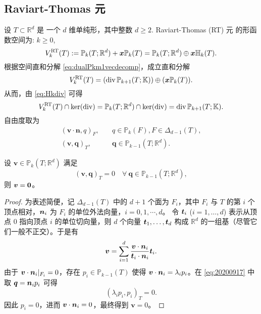 

\subsection{Raviart-Thomas 元}

设 $T\subset \mathbb R^d$ 是 一个 $d$ 维单纯形，其中整数 $d\geq2$. Raviart-Thomas (RT) 元 \cite{RaviartThomas1977,Nedelec1980,ChenHuang2022} 的形函数空间为: $k\geq0$,
$$
V_k^{\rm RT}(T):= \mathbb P_{k}(T; \mathbb R^d) + \boldsymbol x\mathbb P_{k}(T)=\mathbb P_{k}(T; \mathbb R^d) \oplus \boldsymbol x\mathbb H_{k}(T).
$$ 
根据空间直和分解 \eqref{eq:dualPkm1vecdecomp}，成立直和分解
$$
V_k^{\rm RT}(T)= (\div\mathbb P_{k+1}(T;\mathbb K))\oplus (\boldsymbol x\mathbb P_{k}(T)).
$$ 
从而，由 \eqref{eq:Hkdiv} 可得 
$$
V_k^{\rm RT}(T)\cap\ker(\div)=\mathbb P_{k}(T; \mathbb R^d)\cap\ker(\div)=\div\mathbb P_{k+1}(T;\mathbb K).
$$
自由度取为
\begin{subequations}\label{RTfemdof}
\begin{align}
(\boldsymbol v\cdot\boldsymbol  n, q)_F, & \quad q\in\mathbb P_{k}(F),  F\in\Delta_{d-1}(T),\label{RTfemdof1}\\
(\boldsymbol v, \boldsymbol q)_T, & \quad \boldsymbol q\in\mathbb P_{k-1}(T; \mathbb R^d). \label{RTfemdof2}
\end{align}
\end{subequations}

\begin{lemma}\label{lem:20250930}
设 $\boldsymbol{v}\in \mathbb P_{k}(T; \mathbb R^d)$ 满足
\begin{equation}\label{eq:20200917}
(\boldsymbol v, \boldsymbol q)_T =0 \quad \forall~\boldsymbol q\in\mathbb P_{k-1}(T; \mathbb R^d),
\end{equation}
则 $\boldsymbol v=\bs 0$。
\end{lemma}
\begin{proof}
为表述简便，记 $\Delta_{d-1}(T)$ 中的 $d+1$ 个面为 $F_i$，其中 $F_i$ 与 $T$ 的第 $i$ 个顶点相对，$\bs n_i$ 为 $F_i$ 的单位外法向量，$i=0,1,\cdots,d$。
令 $\bs t_i$ ($i=1,\ldots,d$) 表示从顶点 $0$ 指向顶点 $i$ 的单位切向量，则 $d$ 个向量 ${\bs t_1, \ldots, \bs t_d}$ 构成 $\mathbb R^d$ 的一组基（尽管它们一般不正交）。于是有
\[
\bs v=\sum_{i=1}^d\frac{\bs v\cdot\bs n_i}{\bs t_i\cdot\bs n_i}\bs t_i.
\]
由于 $\bs v\cdot\bs n_i|_{F_i}=0$，存在 $p_i\in\mathbb P_{k-1}(T)$ 使得 $\bs v\cdot\bs n_i=\lambda_ip_i$。在 \eqref{eq:20200917} 中取 $\bs q=\bs n_ip_i$ 可得
\[
(\lambda_ip_i, p_i)_T =0.
\]
因此 $p_i=0$，进而 $\boldsymbol v\cdot\bs n_i=0$，最终得到 $\boldsymbol v= 0$。
\end{proof}

